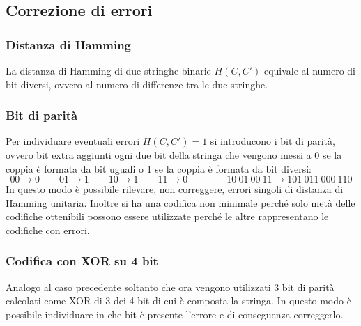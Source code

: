 \documentclass[a4paper]{article}
\begin{document}
\newpage


\subsection{Correzione di errori}
\subsubsection*{Distanza di Hamming}
La distanza di Hamming di due stringhe binarie \(H(C,C')\) equivale al numero di bit diversi, ovvero al numero di differenze tra le due stringhe.

\subsubsection*{Bit di parità}
Per individuare eventuali errori \(H(C,C')=1\) si introducono i bit di parità, ovvero bit extra aggiunti ogni due bit della
stringa che vengono messi a 0 se la coppia è formata da bit uguali o 1 se la coppia è formata da bit diversi:
\[00 \rightarrow 0 \qquad 01 \rightarrow 1 \qquad 10 \rightarrow 1 \qquad 11 \rightarrow 0 \qquad\qquad 10\ 01\ 00\ 11 \rightarrow 101\ 011\ 000\ 110\]
In questo modo è possibile rilevare, non correggere, errori singoli di distanza di Hamming unitaria. Inoltre si ha una codifica
non minimale perché solo metà delle codifiche ottenibili possono essere utilizzate perché le altre rappresentano le codifiche
con errori.

\subsubsection*{Codifica con XOR su 4 bit}
Analogo al caso precedente soltanto che ora vengono utilizzati 3 bit di parità calcolati come XOR di 3 dei 4 bit di cui è composta
la stringa. In questo modo è possibile individuare in che bit è presente l'errore e di conseguenza correggerlo.
\end{document}
